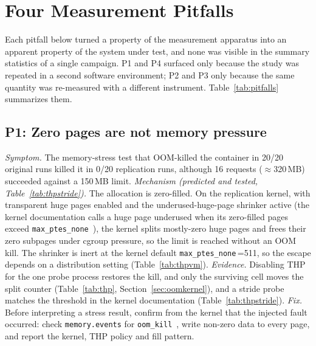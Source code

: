 \documentclass[conference]{IEEEtran}
\begin{document}
\begin{table}[t]
\centering
\caption{Original against replication: which findings held, computed from
Table~\ref{tab:replication}, the raw data and the Experiment~6 and~7 results
(\texttt{reproducibility\_table.py}). \emph{Reproduced}: every metric in the row has
the original mean inside the replication's 95\% interval, or the stated qualitative
result held. \emph{Environment-sensitive}: every metric lies outside it, or the
qualitative result changed. \emph{Not supported by replication}: a first-campaign
explanation that the replication and Experiments~6--7 contradict. \emph{Inconclusive}:
the data cannot decide. Where the replication interval is wide (the CPU rows),
``reproduced'' means not distinguishable, not shown equal.}
\label{tab:reproducibility}
\small

\end{table}

\section{Four Measurement Pitfalls}
\label{sec:pitfalls}
Each pitfall below turned a property of the measurement apparatus into an apparent
property of the system under test, and none was visible in the summary statistics of a
single campaign. P1 and P4 surfaced only because the study was repeated in a second
software environment; P2 and P3 only because the same quantity was re-measured with a
different instrument. Table~\ref{tab:pitfalls} summarizes them.

\subsection{P1: Zero pages are not memory pressure}
\label{sec:p1}
\emph{Symptom.} The memory-stress test that OOM-killed the container in 20/20 original
runs killed it in 0/20 replication runs, although 16 requests ($\approx$320\,MB) succeeded
against a 150\,MB limit. \emph{Mechanism (predicted and tested, Table~\ref{tab:thpstride}).} The allocation is zero-filled. On the replication
kernel, with transparent huge pages enabled and the underused-huge-page shrinker active (the
kernel documentation calls a huge page underused when its zero-filled pages exceed
\texttt{max\_ptes\_none}~\cite{kernelthp}), the
kernel splits mostly-zero huge pages and frees their zero subpages under cgroup pressure,
so the limit is reached without an OOM kill. The shrinker is inert at the kernel default
\texttt{max\_ptes\_none}\,=511, so the escape depends on a distribution setting
(Table~\ref{tab:thpvm}). \emph{Evidence.} Disabling THP for the one
probe process restores the kill, and only the surviving cell moves the split counter
(Table~\ref{tab:thp}, Section~\ref{sec:oomkernel}), and a stride probe matches the threshold in the kernel documentation (Table~\ref{tab:thpstride}). \emph{Fix.} Before interpreting
a stress result, confirm from the kernel that the injected fault occurred: check
\texttt{memory.events} for \texttt{oom\_kill}~\cite{kernelcgroup}, write non-zero data to every page, and
report the kernel, THP policy and fill pattern.
\end{document}
